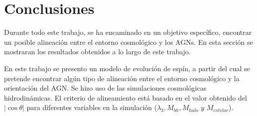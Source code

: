 




\newpage
\section{Conclusiones}
\label{sec: conclusiones}
Durante todo este trabajo, se ha encaminado en un objetivo específico, encontrar un posible alineación entre el entorno cosmológico y los AGNs. En esta sección se mostraran los resultados obtenidos a lo largo de este trabajo.


En este trabajo se presento un modelo de evolución de espín, a partir del cual se pretende encontrar algún tipo de alineación entre el entorno cosmológico y la orientación del AGN. Se hizo uso de las simulaciones cosmológicas hidrodinámicas. El criterio de alineamiento está basado en el valor obtenido del $|\cos \theta|$ para diferentes variables en la simulación ($\lambda_{3}, M_{bh}, M_{halo} \,\, y \,\, M_{estelar}$). 

